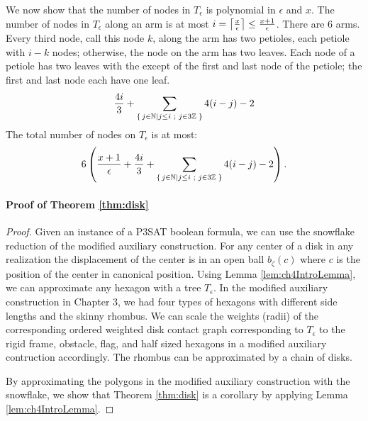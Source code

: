 We now show that the number of nodes in $T_\epsilon$ is polynomial in $\epsilon$ and $x$.  
The number of nodes in $T_\epsilon$ along an arm is at most $i=\left\lceil \frac{x}{\epsilon} \right\rceil \leq \frac{x+1}{\epsilon}$.  There are 6 arms.
Every third node, call this node $k$, along the arm has two petioles, each petiole with $i-k$ nodes; otherwise, the node on the arm has two leaves.  
Each node of a petiole has two leaves with the except of the first and last node of the petiole; the first and last node each have one leaf.   
$$\frac{4i}{3}  + \sum_{{\left\lbrace \left. j \in {\mathbb{N}} \left\vert j \leq i \text{ ; } j \in 3{\mathbb{Z}} \right.\right.\right\rbrace }} 4(i - j) - 2$$
The total number of nodes on $T_\epsilon$ is at most:
$$6 \left( \frac{x+1}{\epsilon} + \frac{4i}{3}   + \sum_{{\left\lbrace \left. j \in {\mathbb{N}} \left\vert j \leq i \text{ ; } j \in 3{\mathbb{Z}} \right.\right.\right\rbrace }} 4(i - j) - 2 \right).$$









   



\paragraph{Proof of Theorem \ref{thm:disk}}

\begin{proof}
Given an instance of a P3SAT boolean formula, we can use the snowflake reduction of the modified auxiliary construction.  
For any center of a disk in any realization the displacement of the center is in an open ball $b_{\zeta}(c)$ where $c$ is the position of the center in canonical position.  
Using Lemma \ref{lem:ch4IntroLemma}, we can approximate any hexagon with a tree $T_\epsilon$.  
In the modified auxiliary construction in Chapter 3, we had four types of hexagons with different side lengths and the skinny rhombus.  
We can scale the weights (radii) of the corresponding ordered weighted disk contact graph corresponding to $T_\epsilon$ to the rigid frame, obstacle, flag, and half sized hexagons in a modified auxiliary contruction accordingly.  
The rhombus can be approximated by a chain of disks.

By approximating the polygons in the modified auxiliary construction with the snowflake, we show that Theorem \ref{thm:disk} is a corollary by applying Lemma \ref{lem:ch4IntroLemma}.  
\end{proof}
